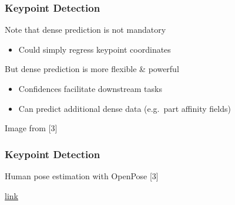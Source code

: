 \documentclass[xetex,professionalfont]{beamer}
\begin{document}
\begin{frame}
	\frametitle{Keypoint Detection}

	Note that dense prediction is not mandatory
	\begin{itemize}
		\item Could simply regress keypoint coordinates
	\end{itemize}

	\bigskip
	But dense prediction is more flexible \& powerful
	\begin{itemize}
		\item Confidences facilitate downstream tasks
		\item Can predict additional dense data (e.g.~part affinity fields)
	\end{itemize}

	\medskip
	\begin{center}
		{\centering Image from [3]}
	\end{center}

\end{frame}


\begin{frame}
	\frametitle{Keypoint Detection}

	Human pose estimation with OpenPose [3]
	\bigskip

	\begin{center}
		{\centering\href{https://www.youtube.com/watch?v=pW6nZXeWlGM}{link}}
	\end{center}

\end{frame}
\end{document}
